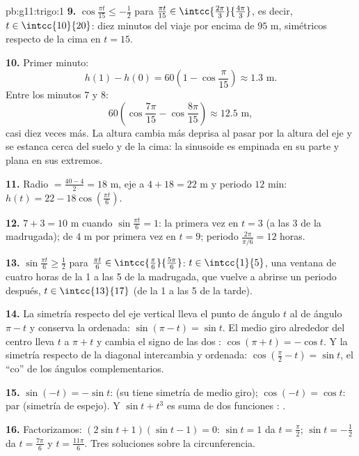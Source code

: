 \begin{solution}{pb:g11:trigo:1}
\textbf{9.} $\cos\frac{\pi t}{15} \leq -\frac12$ para
$\frac{\pi t}{15} \in \intcc{\frac{2\pi}{3}}{\frac{4\pi}{3}}$, es decir,
$t \in \intcc{10}{20}$: diez minutos del viaje por encima de $95$ m,
simétricos respecto de la cima en $t = 15$.

\textbf{10.} Primer minuto:
\[
h(1) - h(0) = 60\left(1 - \cos\frac{\pi}{15}\right)
\approx 1.3 \text{ m}.
\]
Entre los minutos $7$ y $8$:
\[
60\left(\cos\frac{7\pi}{15} - \cos\frac{8\pi}{15}\right)
\approx 12.5 \text{ m},
\]
casi diez veces más. La altura cambia más deprisa al pasar por la altura
del eje y se estanca cerca del suelo y de la cima: la sinusoide es
empinada en su parte  y plana en sus extremos.

\textbf{11.} Radio $= \frac{40 - 4}{2} = 18$ m, eje a $4 + 18 = 22$ m y
periodo $12$ min: $h(t) = 22 - 18\cos\left(\frac{\pi t}{6}\right)$.

\textbf{12.}  $7 + 3 = 10$ m cuando $\sin\frac{\pi t}{6} = 1$: la
primera vez en $t = 3$ (a las 3 de la madrugada);  de $4$ m por
primera vez en $t = 9$; periodo $\frac{2\pi}{\pi/6} = 12$ horas.

\textbf{13.} $\sin\frac{\pi t}{6} \geq \frac12$ para
$\frac{\pi t}{6} \in \intcc{\frac\pi6}{\frac{5\pi}{6}}$:
$t \in \intcc{1}{5}$, una ventana de cuatro horas de la 1 a las 5 de la
madrugada, que vuelve a abrirse un periodo después,
$t \in \intcc{13}{17}$ (de la 1 a las 5 de la tarde).

\textbf{14.} La simetría respecto del eje vertical lleva el punto de
ángulo $t$ al de ángulo $\pi - t$ y conserva la ordenada:
$\sin(\pi - t) = \sin t$. El medio giro alrededor del centro lleva $t$ a
$\pi + t$ y cambia el signo de las dos :
$\cos(\pi + t) = -\cos t$. Y la simetría respecto de la diagonal
intercambia  y ordenada:
$\cos\left(\frac\pi2 - t\right) = \sin t$, el ``co'' de los ángulos
complementarios.

\textbf{15.} $\sin(-t) = -\sin t$:  (su  tiene simetría de
medio giro); $\cos(-t) = \cos t$: par (simetría de espejo). Y
$\sin t + t^3$ es suma de dos funciones : .

\textbf{16.} Factorizamos: $(2\sin t + 1)(\sin t - 1) = 0$:
$\sin t = 1$ da $t = \frac\pi2$; $\sin t = -\frac12$ da
$t = \frac{7\pi}{6}$ y $t = \frac{11\pi}{6}$. Tres soluciones sobre la
circunferencia.


\end{solution}
